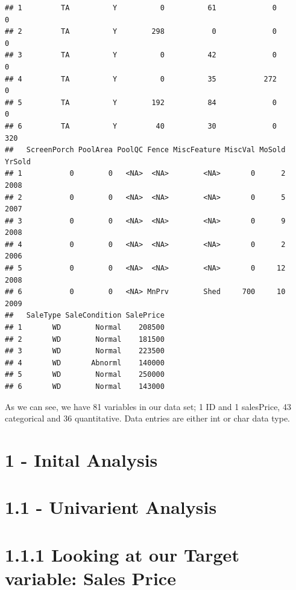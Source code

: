\documentclass[]{article}
\newenvironment{Shaded}{\begin{snugshade}}{\end{snugshade}}
\newcommand{\KeywordTok}[1]{\textcolor[rgb]{0.13,0.29,0.53}{\textbf{#1}}}
\newcommand{\OperatorTok}[1]{\textcolor[rgb]{0.81,0.36,0.00}{\textbf{#1}}}
\newcommand{\NormalTok}[1]{#1}
\begin{document}
\begin{verbatim}
## 1         TA          Y          0          61             0          0
## 2         TA          Y        298           0             0          0
## 3         TA          Y          0          42             0          0
## 4         TA          Y          0          35           272          0
## 5         TA          Y        192          84             0          0
## 6         TA          Y         40          30             0        320
##   ScreenPorch PoolArea PoolQC Fence MiscFeature MiscVal MoSold YrSold
## 1           0        0   <NA>  <NA>        <NA>       0      2   2008
## 2           0        0   <NA>  <NA>        <NA>       0      5   2007
## 3           0        0   <NA>  <NA>        <NA>       0      9   2008
## 4           0        0   <NA>  <NA>        <NA>       0      2   2006
## 5           0        0   <NA>  <NA>        <NA>       0     12   2008
## 6           0        0   <NA> MnPrv        Shed     700     10   2009
##   SaleType SaleCondition SalePrice
## 1       WD        Normal    208500
## 2       WD        Normal    181500
## 3       WD        Normal    223500
## 4       WD       Abnorml    140000
## 5       WD        Normal    250000
## 6       WD        Normal    143000
\end{verbatim}

As we can see, we have 81 variables in our data set; 1 ID and 1
salesPrice, 43 categorical and 36 quantitative. Data entries are either
int or char data type.

\section{1 - Inital Analysis}\label{inital-analysis}

\section{1.1 - Univarient Analysis}\label{univarient-analysis}

\section{1.1.1 Looking at our Target variable: Sales
Price}\label{looking-at-our-target-variable-sales-price}

\begin{Shaded}
\end{Shaded}
\end{document}
